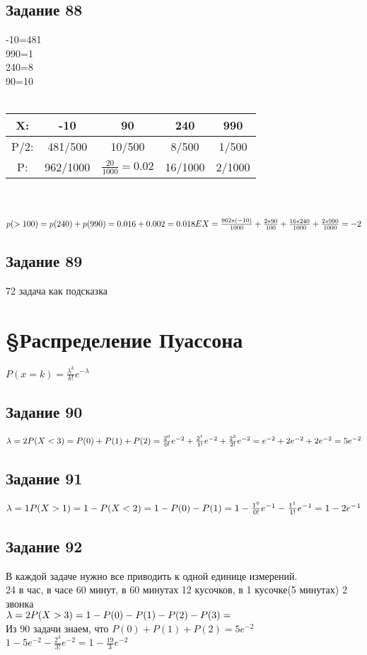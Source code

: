 \documentclass[12pt]{article}
\begin{document}
\subsection{Задание 88}

-10=481\\
990=1\\
240=8\\
90=10\\
\\
\begin{tabular}{|c|c|c|c|c|}
\hline
X: & -10 & 90 & 240 & 990  \\
\hline
P/2: & 481/500 & 10/500 & 8/500 & 1/500 \\
\hline
P: & 962/1000 &$ \frac{20}{1000}=0.02$ & 16/1000 & 2/1000 \\
\hline
\end{tabular}
\\
\\
$
p(>100)= p(240)+p(990)=0.016+0.002=0.018\\
EX = \frac{962*(-10)}{1000}+\frac{2*90}{100}+\frac{16*240}{1000}+\frac{2*990}{1000}=-2
$

\newpage
\subsection{Задание 89}

72 задача как подсказка

\newpage
\section{\S Распределение Пуассона}
$
P(x=k)=\frac{\lambda^k}{k!}e^{-\lambda}
$
\subsection{Задание 90}
$
\lambda=2\\
P(X<3)=P(0)+P(1)+P(2)=
\frac{2^0}{0!}e^{-2}+\frac{2^1}{1!}e^{-2}+\frac{2^2}{2!}e^{-2}=
e^{-2}+2e^{-2}+2e^{-2}=5e^{-2}
$
\newpage
\subsection{Задание 91}
$
\lambda=1\\
P(X>1)=1-P(X<2)=1-P(0)-P(1)=
1-\frac{1^0}{0!}e^{-1}-\frac{1^1}{1!}e^{-1}=
1-2e^{-1}
$
\newpage
\subsection{Задание 92}
В каждой задаче нужно все приводить к одной единице измерений.\\
24 в час, в часе 60 минут, в 60 минутах 12 кусочков, в 1 кусочке(5 минутах) 2 звонка\\
$
\lambda=2\\
P(X>3)=1-P(0)-P(1)-P(2)-P(3)=
$\\
Из 90 задачи знаем, что $P(0)+P(1)+P(2)=5e^{-2}$\\
$
1-5e^{-2}-\frac{2^3}{3!}e^{-2}=1-\frac{19}{3}e^{-2}
$
\newpage
\end{document}
